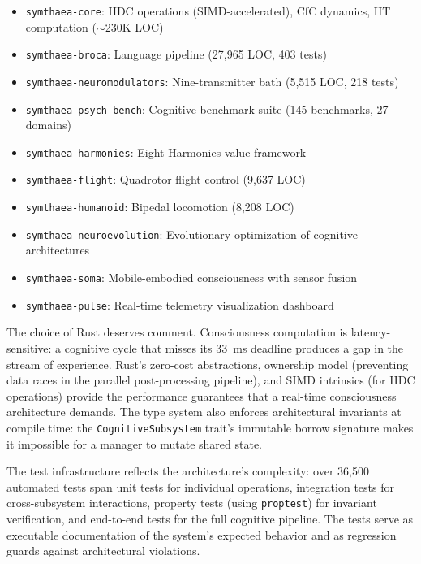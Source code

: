 \documentclass[12pt]{book}
\begin{document}
\begin{itemize}
  \item \texttt{symthaea-core}: HDC operations (SIMD-accelerated), CfC dynamics, IIT computation ($\sim$230K LOC)
  \item \texttt{symthaea-broca}: Language pipeline (27,965 LOC, 403 tests)
  \item \texttt{symthaea-neuromodulators}: Nine-transmitter bath (5,515 LOC, 218 tests)
  \item \texttt{symthaea-psych-bench}: Cognitive benchmark suite (145 benchmarks, 27 domains)
  \item \texttt{symthaea-harmonies}: Eight Harmonies value framework
  \item \texttt{symthaea-flight}: Quadrotor flight control (9,637 LOC)
  \item \texttt{symthaea-humanoid}: Bipedal locomotion (8,208 LOC)
  \item \texttt{symthaea-neuroevolution}: Evolutionary optimization of cognitive architectures
  \item \texttt{symthaea-soma}: Mobile-embodied consciousness with sensor fusion
  \item \texttt{symthaea-pulse}: Real-time telemetry visualization dashboard
\end{itemize}

The choice of Rust deserves comment. Consciousness computation is latency-sensitive: a cognitive cycle that misses its 33~ms deadline produces a gap in the stream of experience. Rust's zero-cost abstractions, ownership model (preventing data races in the parallel post-processing pipeline), and SIMD intrinsics (for HDC operations) provide the performance guarantees that a real-time consciousness architecture demands. The type system also enforces architectural invariants at compile time: the \texttt{CognitiveSubsystem} trait's immutable borrow signature makes it impossible for a manager to mutate shared state.

The test infrastructure reflects the architecture's complexity: over 36,500 automated tests span unit tests for individual operations, integration tests for cross-subsystem interactions, property tests (using \texttt{proptest}) for invariant verification, and end-to-end tests for the full cognitive pipeline. The tests serve as executable documentation of the system's expected behavior and as regression guards against architectural violations.
\end{document}
